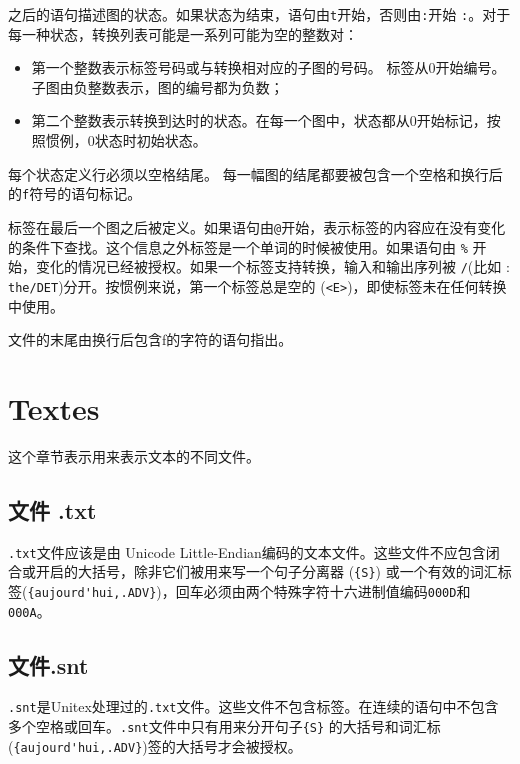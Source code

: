 \bigskip
\noindent 
之后的语句描述图的状态。如果状态为结束，语句由\verb+t+开始，否则由\verb+:+开始 \verb+:+。对于每一种状态，转换列表可能是一系列可能为空的整数对：

\begin{itemize}
  \item
第一个整数表示标签号码或与转换相对应的子图的号码。  标签从0开始编号。子图由负整数表示，图的编号都为负数；


  \item 
 第二个整数表示转换到达时的状态。在每一个图中，状态都从0开始标记，按照惯例，0状态时初始状态。
  

\end{itemize}

\bigskip
\noindent

每个状态定义行必须以空格结尾。
每一幅图的结尾都要被包含一个空格和换行后的\verb+f+符号的语句标记。

\bigskip
\noindent
标签在最后一个图之后被定义。如果语句由\verb+@+开始，表示标签的内容应在没有变化的条件下查找。这个信息之外标签是一个单词的时候被使用。如果语句由 \verb+%+ 开始，变化的情况已经被授权。如果一个标签支持转换，输入和输出序列被 \verb+/+(比如 : \verb+the/DET+)分开。按惯例来说，第一个标签总是空的 (\verb+<E>+)，即使标签未在任何转换中使用。

\bigskip
\noindent
文件的末尾由换行后包含f的字符的语句指出。




\section{Textes}
这个章节表示用来表示文本的不同文件。

\subsection{文件 .txt}
\label{section-texts}
\verb+.txt+文件应该是由 Unicode Little-Endian编码的文本文件。这些文件不应包含闭合或开启的大括号，除非它们被用来写一个句子分离器 (\verb+{S}+) 或一个有效的词汇标签(\verb+{aujourd'hui,.ADV}+)，回车必须由两个特殊字符十六进制值编码\verb+000D+和\verb+000A+。


\subsection{文件.snt}
\verb+.snt+是Unitex处理过的\verb+.txt+文件。这些文件不包含标签。在连续的语句中不包含多个空格或回车。\verb+.snt+文件中只有用来分开句子\verb+{S}+
的大括号和词汇标 (\verb+{aujourd'hui,.ADV}+)签的大括号才会被授权。

